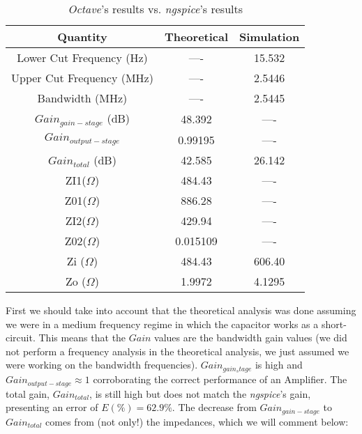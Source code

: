 \begin{center}
    \begin{table}[H]
        \centering
        \begin{tabular}{c|c|c}
          \textbf{Quantity} & \textbf{Theoretical}  & \textbf{Simulation}  \\
          \hline
            Lower Cut Frequency (Hz) &  ---- &  15.532 \\
            Upper Cut Frequency (MHz)&  ---- &  2.5446 \\
            Bandwidth (MHz)      &  ----   &  2.5445 \\
            $Gain_{gain-stage}$ (dB) &	48.392  & ---- \\
            $Gain_{output-stage}$  &	0.99195  & ----\\
            $Gain_{total}$ (dB)   &	42.585 & 26.142 \\
            ZI1($\Omega$)  &	484.43 & ----\\
            Z01($\Omega$)  &	886.28 & ----\\
            ZI2($\Omega$)  &	429.94 & ----\\
            Z02($\Omega$) & 0.015109 & ----\\
            Zi ($\Omega$)& 484.43 & 606.40\\
            Zo ($\Omega$)& 1.9972 & 4.1295\\
        \end{tabular}
        \caption{\textit{Octave}'s results vs. \textit{ngspice}'s results}
    \end{table}
\end{center}

First we should take into account that the theoretical analysis was done assuming we were in a medium frequency regime in which
the capacitor works as a short-circuit.
This means that the $Gain$ values are the bandwidth gain values (we did not perform a frequency analysis in the theoretical analysis,
we just assumed we were working on the bandwidth frequencies).
$Gain_{gain_stage}$ is high and $Gain_{output-stage} \approx 1$ corroborating the correct performance of an Amplifier. The total gain, $Gain_{total}$, is still high
but does not match the \textit{ngspice}'s gain, presenting an error of $E(\%)=62.9\% $. The decrease from $Gain_{gain-stage}$ to $Gain_{total}$ comes from (not only!) the impedances,
which we will comment below:\par


